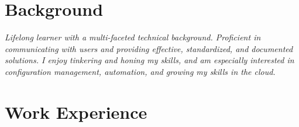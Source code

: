 \documentclass[line]{res}
\begin{document}

\address{Oklahoma City, OK $\parallel$ trjean.ou@gmail.com $\parallel$ (580) 304-6896}

\begin{resume}

\section{Background}
\emph{Lifelong learner with a multi-faceted technical background. Proficient in communicating with users and providing effective, standardized, and documented solutions. I enjoy tinkering and honing my skills, and am especially interested in configuration management, automation, and growing my skills in the cloud.}

\section{Work Experience}


\end{resume}
\end{document}
